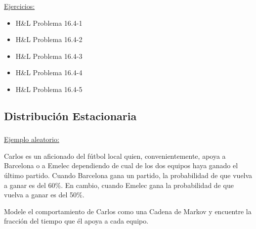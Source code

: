\documentclass[ 10pt, xcolor = dvipsnames]{beamer}
\begin{document}
\begin{frame}[allowframebreaks]
\frametitle{\insertsubsection}

\underline{Ejercicios:}
\begin{itemize}
\item H\&L Problema 16.4-1
\item H\&L Problema 16.4-2
\item H\&L Problema 16.4-3
\item H\&L Problema 16.4-4
\item H\&L Problema 16.4-5
\end{itemize}

\end{frame}

\subsection{Distribuci\'on Estacionaria}

\begin{frame}[allowframebreaks]
\frametitle{\insertsubsection}

\underline{Ejemplo aleatorio:}

Carlos es un aficionado del f\'utbol local quien, convenientemente, apoya a Barcelona o a Emelec dependiendo de cual de los dos equipos haya ganado el \'ultimo partido. Cuando Barcelona gana un partido, la probabilidad de que vuelva a ganar es del 60\%. En cambio, cuando Emelec gana la probabilidad de que vuelva a ganar es del 50\%. 

Modele el comportamiento de Carlos como una Cadena de Markov y encuentre la fracci\'on del tiempo que \'el apoya a cada equipo. 

\end{frame}
\end{document}
